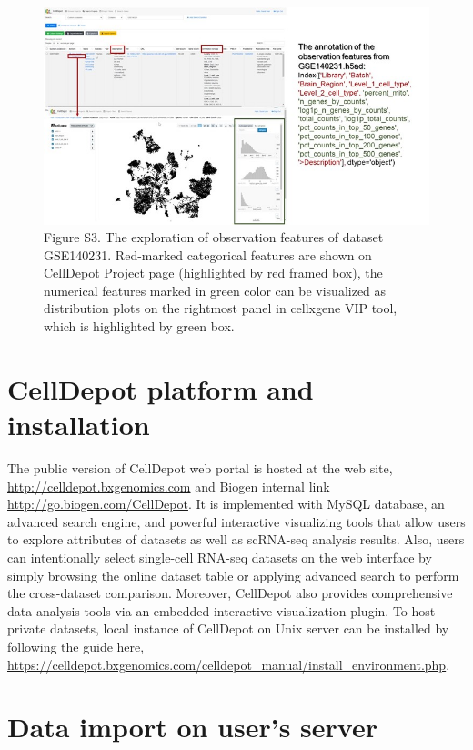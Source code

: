 \documentclass[
]{book}
\begin{document}
\begin{figure}
\centering
\includegraphics{figures/S3.jpg}
\caption{Figure S3. The exploration of observation features of dataset GSE140231. Red-marked categorical features are shown on CellDepot Project page (highlighted by red framed box), the numerical features marked in green color can be visualized as distribution plots on the rightmost panel in cellxgene VIP tool, which is highlighted by green box.}
\end{figure}

\hypertarget{celldepot-platform-and-installation}{%
\section{CellDepot platform and installation}\label{celldepot-platform-and-installation}}

The public version of CellDepot web portal is hosted at the web site, \url{http://celldepot.bxgenomics.com} and Biogen internal link \url{http://go.biogen.com/CellDepot}. It is implemented with MySQL database, an advanced search engine, and powerful interactive visualizing tools that allow users to explore attributes of datasets as well as scRNA-seq analysis results. Also, users can intentionally select single-cell RNA-seq datasets on the web interface by simply browsing the online dataset table or applying advanced search to perform the cross-dataset comparison. Moreover, CellDepot also provides comprehensive data analysis tools via an embedded interactive visualization plugin. To host private datasets, local instance of CellDepot on Unix server can be installed by following the guide here, \url{https://celldepot.bxgenomics.com/celldepot_manual/install_environment.php}.

\hypertarget{data-import-on-users-server}{%
\section{Data import on user's server}\label{data-import-on-users-server}}
\end{document}
